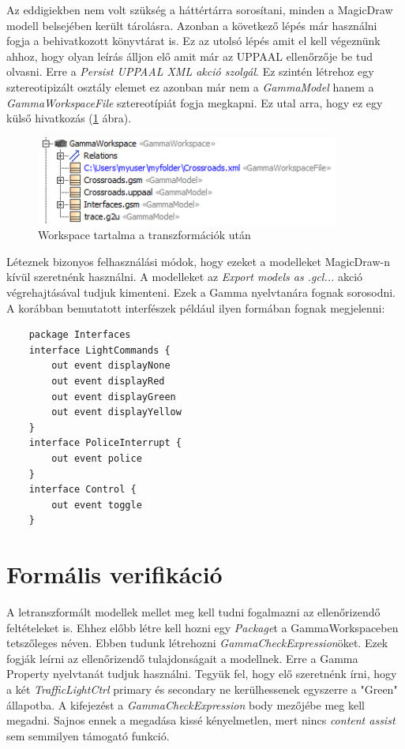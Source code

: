 Az eddigiekben nem volt szükség a háttértárra sorosítani, minden a MagicDraw modell belsejében került tárolásra. Azonban a következő lépés már használni fogja a behivatkozott könyvtárat is. Ez az utolsó lépés amit el kell végeznünk ahhoz, hogy olyan leírás álljon elő amit már az UPPAAL ellenőrzője be tud olvasni. Erre a \emph{Persist UPPAAL XML akció szolgál}. Ez szintén létrehoz egy sztereotipizált osztály elemet ez azonban már nem a \emph{GammaModel} hanem a \emph{GammaWorkspaceFile} sztereotípiát fogja megkapni. Ez utal arra, hogy ez egy külső hivatkozás (\ref{fig:gwsfinal} ábra).

\begin{figure}[!ht]
	\centering
	\includegraphics[width=10cm, keepaspectratio]{figures/contribution/gwsfinal.png}
	\caption{Workspace tartalma a transzformációk után}
	\label{fig:gwsfinal}
\end{figure}

Léteznek bizonyos felhasználási módok, hogy ezeket a modelleket MagicDraw-n kívül szeretnénk használni. A modelleket az \emph{Export models as .gcl...} akció végrehajtásával tudjuk kimenteni. Ezek a Gamma nyelvtanára fognak sorosodni.
A korábban bemutatott interfészek például ilyen formában fognak megjelenni:

\begin{lstlisting}
	package Interfaces
	interface LightCommands {
		out event displayNone
		out event displayRed
		out event displayGreen
		out event displayYellow
	}
	interface PoliceInterrupt {
		out event police
	}
	interface Control {
		out event toggle
	}
\end{lstlisting}

\section{Formális verifikáció}
 
A letranszformált modellek mellet meg kell tudni fogalmazni az ellenőrizendő feltételeket is. Ehhez előbb létre kell hozni egy \emph{Package}t a GammaWorkspaceben tetszőleges néven. Ebben tudunk létrehozni \emph{GammaCheckExpression}öket. Ezek fogják leírni az ellenőrizendő tulajdonságait a modellnek. Erre a Gamma Property nyelvtanát tudjuk használni. Tegyük fel, hogy elő szeretnénk írni, hogy a két \emph{TrafficLightCtrl} primary és secondary ne kerülhessenek egyszerre a "Green" állapotba. A kifejezést a \emph{GammaCheckExpression}  body mezőjébe meg kell megadni. Sajnos ennek a megadása kissé kényelmetlen, mert nincs \emph{content assist} sem semmilyen támogató funkció.

